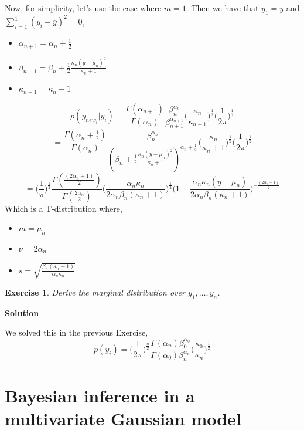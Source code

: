 \documentclass[twoside]{article}
\newcounter{lecnum}
\newtheorem{exercise}{Exercise}[lecnum]
\begin{document}
Now, for simplicity, let's use the case where $m=1$. Then we have that $y_1=\overline{y}$ and $\sum_{i=1}^{1} (y_i - \overline{y})^2 = 0$,
\begin{itemize}
	\item  $\alpha_{n+1} = \alpha_n + \frac{1}{2} $
	\item $ \beta_{n+1} = \beta_n + \frac{1}{2} 
	\frac{\kappa_n (y-\mu_n)^2}{\kappa_n+1} $
	\item $ \kappa_{n+1} = \kappa_n + 1$
\end{itemize}
$$ p(y_{new_i}|y_i) = 
\frac{\Gamma(\alpha_{n+1})}{\Gamma(\alpha_n)}
\frac{\beta_n^{\alpha_n}}{\beta_{n+1}^{\alpha_{n+1}}}
\bigg(\frac{\kappa_n}{ \kappa_{n+1}} \bigg)^{\frac{1}{2}} 
\bigg(\frac{1}{ 2 \pi} \bigg)^{\frac{1}{2}} $$
$$ = 
\frac{\Gamma(\alpha_n + \frac{1}{2})}{\Gamma(\alpha_n)}
\frac{\beta_n^{\alpha_n}}{(\beta_n + \frac{1}{2} 
	\frac{\kappa_n (y-\mu_n)^2}{\kappa_n+1})^{\alpha_n + \frac{1}{2}}}
\bigg(\frac{\kappa_n}{ \kappa_n + 1} \bigg)^{\frac{1}{2}} 
\bigg(\frac{1}{ 2 \pi} \bigg)^{\frac{1}{2}}$$
$$ =
\bigg(\frac{1}{ \pi} \bigg)^{\frac{1}{2}}
\frac{\Gamma(\frac{(2\alpha_n + 1)}{2})}{\Gamma(\frac{2\alpha_n}{2})}
\bigg( \frac{\alpha_n \kappa_n}{2 \alpha_n \beta_n (\kappa_n+1)}\bigg)^{\frac{1}{2}}
\bigg(1+\frac{\alpha_n \kappa_n (y-\mu_n)}{2 \alpha_n \beta_n (\kappa_n+1)}  \bigg)^{-\frac{(2\alpha_n+1)}{2}}
$$
Which is a T-distribution where,
\begin{itemize}
	\item  $ m  =  \mu_n$
	\item  $ \nu= 2 \alpha_n $
	\item $ s = \sqrt{\frac{\beta_n(\kappa_n+1)}{\alpha_n \kappa_n}}$
\end{itemize}

\color{black}

\begin{exercise}
  Derive the marginal distribution over $y_1,\dots, y_n$.
\end{exercise}

\color{blue}
\textbf{Solution}

We solved this in the previous Exercise,
$$p(y_i) = \bigg(\frac{1}{ 2 \pi} \bigg)^{\frac{n}{2}} 
\frac{\Gamma(\alpha_n)\beta_0^{\alpha_0}}{\Gamma(\alpha_0)\beta_n^{\alpha_n}} \bigg(\frac{\kappa_0}{ \kappa_n} \bigg)^{\frac{1}{2}}$$

\color{black}



\newpage
\section{Bayesian inference in a multivariate Gaussian model}
\end{document}
